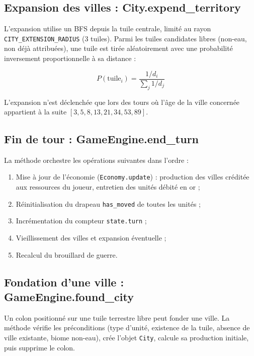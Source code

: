 \documentclass[12pt, a4paper]{article}
\begin{document}
\subsection{Expansion des villes : City.expend\_territory}

L'expansion utilise un BFS depuis la tuile centrale, limité au rayon \texttt{CITY\_EXTENSION\_RADIUS} (3 tuiles). Parmi les tuiles candidates libres (non-eau, non déjà attribuées), une tuile est tirée aléatoirement avec une probabilité inversement proportionnelle à sa distance :

\begin{equation}
    P(\text{tuile}_i) = \frac{1/d_i}{\displaystyle\sum_j 1/d_j}
\end{equation}

L'expansion n'est déclenchée que lors des tours où l'âge de la ville concernée appartient à la suite $[3, 5, 8, 13, 21, 34, 53, 89]$.

\subsection{Fin de tour : GameEngine.end\_turn}

La méthode orchestre les opérations suivantes dans l'ordre :

\begin{enumerate}
    \item Mise à jour de l'économie (\texttt{Economy.update}) : production des villes créditée
    aux ressources du joueur, entretien des unités débité en or ;
    \item Réinitialisation du drapeau \texttt{has\_moved} de toutes les unités ;
    \item Incrémentation du compteur \texttt{state.turn} ;
    \item Vieillissement des villes et expansion éventuelle ;
    \item Recalcul du brouillard de guerre.
\end{enumerate}

\subsection{Fondation d'une ville : GameEngine.found\_city}

Un colon positionné sur une tuile terrestre libre peut fonder une ville. La méthode
vérifie les préconditions (type d'unité, existence de la tuile, absence de ville existante,
biome non-eau), crée l'objet \texttt{City}, calcule sa production initiale, puis supprime
le colon.
\end{document}
